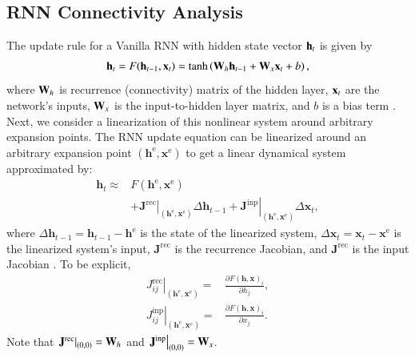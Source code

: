 \documentclass[5p,twocolumn,authoryear]{elsarticle}
\begin{document}
\subsection*{RNN Connectivity Analysis}
The update rule for a Vanilla RNN with hidden state vector $\mathbf{h}_t$ is given by
\begin{align*}
    \mathbf{h}_t = F (\mathbf{h}_{t-1}, \mathbf{x}_t) = \tanh \left(\mathbf{W}_h \mathbf{h}_{t-1} + \mathbf{W}_x \mathbf{x}_t + b \right),
\end{align*}
where $\mathbf{W}_h$ is recurrence (connectivity) matrix of the hidden layer,
$\mathbf{x}_t$ are the network's inputs,
$\mathbf{W}_x$ is the input-to-hidden layer matrix,
and $b$ is a bias term \citep{sussillo2013opening}.
Next, we consider a linearization of this nonlinear system around arbitrary expansion points. 
The RNN update equation can be linearized around an arbitrary expansion point $\left(\mathbf{h}^{\mathrm{e}}, \mathbf{x}^{\mathrm{e}}\right)$ to get a linear dynamical system approximated by: 
\begin{align*}
\mathbf{h}_{t} \approx & F\left(\mathbf{h}^{\mathrm{e}}, \mathbf{x}^{\mathrm{e}}\right) \\
&+ \left.\mathbf{J}^{\mathrm{rec}}\right|_{\left(\mathbf{h}^{\mathrm{e}}, \mathbf{x}^{\mathrm{e}}\right)} \Delta \mathbf{h}_{t-1}+\left.\mathbf{J}^{\mathrm{inp}}\right|_{\left(\mathbf{h}^{\mathrm{e}}, \mathbf{x}^{\mathrm{e}}\right)} \Delta \mathbf{x}_{t},
\end{align*}
where $\Delta \mathbf{h}_{t-1}=\mathbf{h}_{t-1}-\mathbf{h}^{\mathrm{e}}$ is the state of the linearized system, 
\mbox{$\Delta \mathbf{x}_{t}=\mathbf{x}_{t}-\mathbf{x}^{\mathrm{e}}$} is the linearized system's input,
$\mathbf{J}^{\mathrm{rec}}$ is the recurrence Jacobian, and $\mathbf{J}^{\mathrm{rec}}$ is the input Jacobian \citep{maheswaranathan2019reverse}.
To be explicit,
\begin{align*}
\left.J_{i j}^{\mathrm{rec}}\right|_{\left(\mathbf{h}^{\mathrm{}{e}}, \mathbf{x}^{\mathrm{e}}\right)} =& \frac{\partial F(\mathbf{h}, \mathbf{x})_{i}}{\partial h_{j}}, \\ 
\left.J_{i j}^{\mathrm{inp}}\right|_{\left(\mathbf{h}^{e}, \mathbf{x}^{e}\right)}=&\frac{\partial F(\mathbf{h}, \mathbf{x})_{i}}{\partial x_{j}}.
\end{align*}
Note that 
\mbox{$\left.\mathbf{J}^{\mathrm{rec}}\right|_{\left(0, 0\right)} = \mathbf{W}_h$} and
\mbox{$\left.\mathbf{J}^{\mathrm{inp}}\right|_{\left(0, 0\right)} = \mathbf{W}_x$}.
\end{document}
